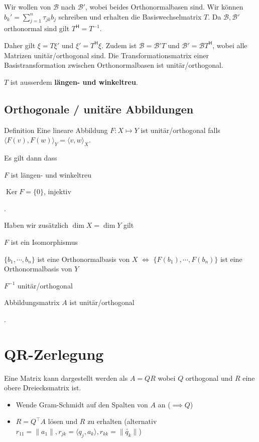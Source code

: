 \documentclass[a4paper,10pt]{article}
\DeclareMathOperator{\Kernel}{Ker}
\newcommand*{\hermconj}{\mathsf{H}}
\begin{document}
Wir wollen von $\mathcal{B}$ nach $\mathcal{B}'$, wobei beides Orthonormalbasen sind. Wir können $b_k' = \sum_{j=1}^n \tau_{jk} b_j$ schreiben und erhalten die Basiswechselmatrix $T$. Da $\mathcal{B}, \mathcal{B}'$ orthonormal sind gilt $T^\hermconj = T^{-1}$.

Daher gilt $\xi = T \xi'$ und $\xi' = T^\hermconj \xi$. Zudem ist $\mathcal{B} = \mathcal{B}' T$ und $\mathcal{B}' = \mathcal{B} T^\hermconj$, wobei alle Matrizen unitär/orthogonal sind. Die Transformationsmatrix einer Basistransformation zwischen Orthonormalbasen ist unitär/orthogonal.

$T$ ist ausserdem \textbf{längen- und winkeltreu}. 

\subsection{Orthogonale / unitäre Abbildungen}


\begin{mainbox}{Definition}
  Eine lineare Abbildung $F: X \mapsto Y$ ist unitär/orthogonal falls $\langle F(v), F(w) \rangle_Y = \langle v, w \rangle_X$.
\end{mainbox}

Es gilt dann dass \begin{rowlist}
  \item $F$ ist längen- und winkeltreu
  \item $\Kernel F = \{0\}$, injektiv
\end{rowlist}.

Haben wir zusätzlich $\dim X = \dim Y$ gilt \begin{rowlist}
  \item $F$ ist ein Isomorphismus
  \item $\{b_1, \cdots, b_n\}$ ist eine Orthonormalbasis von $X$ $\iff$ $\{F(b_1), \cdots, F(b_n)\}$ ist eine Orthonormalbasis von $Y$
  \item $F^{-1}$ unitär/orthogonal
  \item Abbildungsmatrix $A$ ist unitär/orthogonal
\end{rowlist}.

\section{QR-Zerlegung}

Eine Matrix kann dargestellt werden als $A = QR$ wobei $Q$ orthogonal und $R$ eine obere Dreiecksmatrix ist.

\begin{itemize}
  \item Wende Gram-Schmidt auf den Spalten von $A$ an ($\implies Q$)
  \item $R = Q^\top A$ lösen und $R$ zu erhalten (alternativ $r_{11} = \lVert a_1 \rVert, r_{jk} = \langle q_j, a_k \rangle, r_{kk} = \lVert \widetilde{q_k} \rVert$)
\end{itemize}
\end{document}
